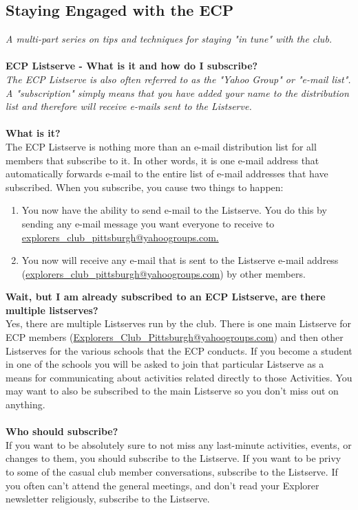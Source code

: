 \documentclass[10pt,a4paper]{article}
\newcommand\subsect[1]{%
  \subsection*{#1}%
  \addcontentsline{toc}{subsection}{#1}}
\begin{document}
\begin{multicols}{2}


\subsect{Staying Engaged with the ECP}
\textit{A multi-part series on tips and techniques for staying "in tune" with the club.}\\
\\
\textbf{ECP Listserve - What is it and how do I subscribe?}\\
\textit{The ECP Listserve is also often referred to as the "Yahoo Group" or "e-mail list".  A "subscription" simply means that you have added your name to the distribution list and therefore will receive e-mails sent to the Listserve.
}
\\
\\
\textbf{What is it?}\\
The ECP Listserve is nothing more than an e-mail distribution list for all members that subscribe to it.  In other words, it is one e-mail address that automatically forwards e-mail to the entire list of e-mail addresses that have subscribed.  When you subscribe, you cause two things to happen:
\begin{enumerate}
\item    You now have the ability to send e-mail to the Listserve.  You do this by sending any e-mail message you want everyone to receive to \url{explorers_club_pittsburgh@yahoogroups.com.}
\item     You now will receive any e-mail that is sent to the Listserve e-mail address (\url{explorers_club_pittsburgh@yahoogroups.com}) by other members.
\end{enumerate}
\textbf{Wait, but I am already subscribed to an ECP Listserve, are there multiple listserves?}\\
Yes, there are multiple Listserves run by the club. There is one main Listserve for ECP members (\url{Explorers_Club_Pittsburgh@yahoogroups.com}) and then other Listserves for the various schools that the ECP conducts. If you become a student in one of the schools you will be asked to join that particular Listserve as a means for communicating about activities related directly to those Activities. You may want to also be subscribed to the main Listserve so you don't miss out on anything.
\\
\\
\textbf{Who should subscribe?} \\
If you want to be absolutely sure to not miss any last-minute activities, events, or changes to them, you should subscribe to the Listserve.  If you want to be privy to some of the casual club member conversations, subscribe to the Listserve.  If you often can't attend the general meetings, and don't read your Explorer newsletter religiously, subscribe to the Listserve.

\end{multicols}
\end{document}
